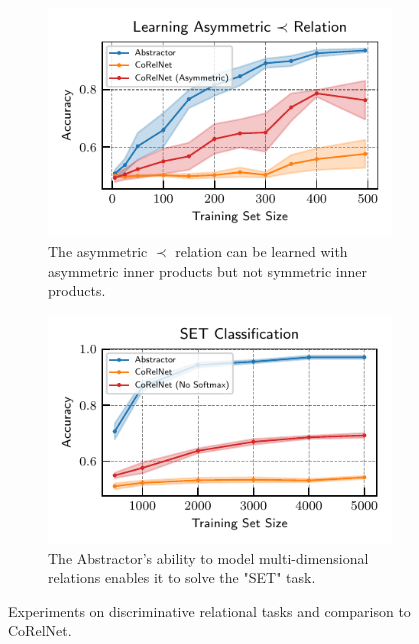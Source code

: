 \begin{figure}[t]
    \begin{subfigure}[t]{0.40\textwidth}
        \includegraphics[scale=.95]{figures/experiments/pairwise_order_learning_curves.pdf}
        \caption{The asymmetric $\prec$ relation can be learned with asymmetric inner products but not symmetric inner products.}\label{fig:exp_order_relation}
    \end{subfigure} \hspace{\fill}
    \begin{subfigure}[t]{0.40\textwidth}
        \includegraphics[scale=.95]{figures/experiments/set_classification.pdf}
        \caption{The Abstractor's ability to model multi-dimensional relations enables it to solve the "SET" task.}\label{fig:exp_set_classification}
    \end{subfigure}
    \caption{Experiments on discriminative relational tasks and comparison to CoRelNet.}
\end{figure}
